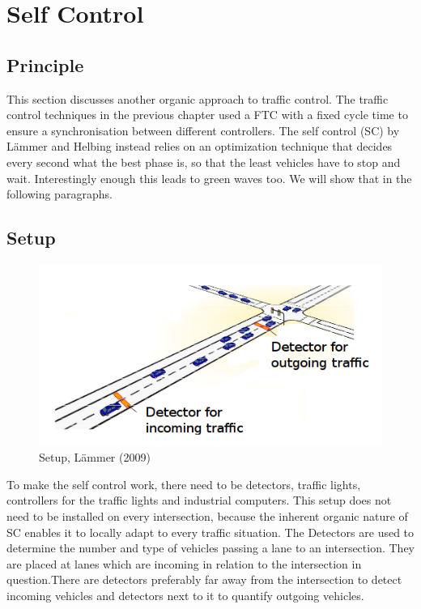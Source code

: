 \section{Self Control}

\subsection{Principle}
This section discusses another organic approach to traffic control. The traffic control techniques in the previous chapter used a FTC with a fixed cycle time to ensure a synchronisation between different controllers. The self control (SC) by L\"ammer and Helbing \cite{laemmer07} instead relies on an optimization technique that decides every second what the best phase is, so that the least vehicles have to stop and wait. Interestingly enough this leads to green waves too. We will show that in the following paragraphs.

\subsection{Setup}

\begin{figure} [!htb]
	\centering
	\includegraphics[scale=0.5]{pic/setup.png}
	\caption{Setup, L\"ammer (2009) \cite{laemmer09}}
	\label{img2}
\end{figure}

To make the self control work, there need to be detectors, traffic lights, controllers for the traffic lights and industrial computers. This setup does not need to be installed on every intersection, because the inherent organic nature of SC enables it to locally adapt to every traffic situation. The Detectors are used to determine the number and type of vehicles passing a lane to an intersection. They are placed at lanes which are incoming in relation to the intersection in question.There are detectors preferably far away from the intersection to detect incoming vehicles and detectors next to it to quantify outgoing vehicles.

